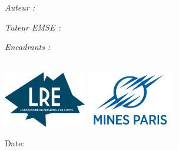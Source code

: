 \begin{titlepage}

\begin{flushleft} \normalsize
\textit{Auteur : } \reportauthor\\ %
\end{flushleft}
\vspace{0.02cm}


\begin{flushleft} \normalsize
\textit{Tuteur EMSE : } \tuteurEMSE\\ %
\end{flushleft}

\begin{flushleft} \normalsize
\textit{Encadrants : } \encadrantUn\\ %
\hspace{2.2cm} \textit{} \encadrantDeux\\
\end{flushleft}
\vspace{0.16cm}


\begin{center}
\includegraphics[width = 3.6cm]{./figures/lre_logo} \hspace{10mm} \includegraphics[width = 3.9cm]{./figures/mines_paris_logo}
\end{center}
\vspace{0.4cm}


\makeatletter

Date: \@date 

\vfill %

\makeatother

\end{titlepage}